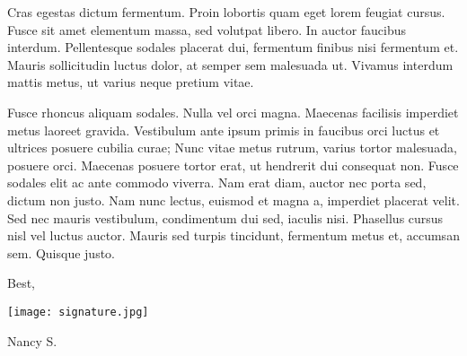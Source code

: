 \documentclass{practical-cover-letter}
\begin{document}
\begin{changemargin}{.7in}{.7in}
Cras egestas dictum fermentum. Proin lobortis quam eget lorem feugiat cursus. Fusce sit amet elementum massa, sed volutpat libero. In auctor faucibus interdum. Pellentesque sodales placerat dui, fermentum finibus nisi fermentum et. Mauris sollicitudin luctus dolor, at semper sem malesuada ut. Vivamus interdum mattis metus, ut varius neque pretium vitae.

Fusce rhoncus aliquam sodales. Nulla vel orci magna. Maecenas facilisis imperdiet metus laoreet gravida. Vestibulum ante ipsum primis in faucibus orci luctus et ultrices posuere cubilia curae; Nunc vitae metus rutrum, varius tortor malesuada, posuere orci. Maecenas posuere tortor erat, ut hendrerit dui consequat non. Fusce sodales elit ac ante commodo viverra. Nam erat diam, auctor nec porta sed, dictum non justo. Nam nunc lectus, euismod et magna a, imperdiet placerat velit. Sed nec mauris vestibulum, condimentum dui sed, iaculis nisi. Phasellus cursus nisl vel luctus auctor. Mauris sed turpis tincidunt, fermentum metus et, accumsan sem. Quisque justo.


\vspace{0.5em}

Best,

 \texttt{[image: signature.jpg]}
 \vspace{-.25cm}

Nancy S.

\end{changemargin} 
\end{document}
